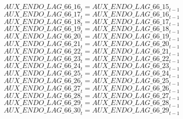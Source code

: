 \begin{dmath}
{AUX\_ENDO\_LAG\_66\_16}_{t}={AUX\_ENDO\_LAG\_66\_15}_{t-1}
\end{dmath}
\begin{dmath}
{AUX\_ENDO\_LAG\_66\_17}_{t}={AUX\_ENDO\_LAG\_66\_16}_{t-1}
\end{dmath}
\begin{dmath}
{AUX\_ENDO\_LAG\_66\_18}_{t}={AUX\_ENDO\_LAG\_66\_17}_{t-1}
\end{dmath}
\begin{dmath}
{AUX\_ENDO\_LAG\_66\_19}_{t}={AUX\_ENDO\_LAG\_66\_18}_{t-1}
\end{dmath}
\begin{dmath}
{AUX\_ENDO\_LAG\_66\_20}_{t}={AUX\_ENDO\_LAG\_66\_19}_{t-1}
\end{dmath}
\begin{dmath}
{AUX\_ENDO\_LAG\_66\_21}_{t}={AUX\_ENDO\_LAG\_66\_20}_{t-1}
\end{dmath}
\begin{dmath}
{AUX\_ENDO\_LAG\_66\_22}_{t}={AUX\_ENDO\_LAG\_66\_21}_{t-1}
\end{dmath}
\begin{dmath}
{AUX\_ENDO\_LAG\_66\_23}_{t}={AUX\_ENDO\_LAG\_66\_22}_{t-1}
\end{dmath}
\begin{dmath}
{AUX\_ENDO\_LAG\_66\_24}_{t}={AUX\_ENDO\_LAG\_66\_23}_{t-1}
\end{dmath}
\begin{dmath}
{AUX\_ENDO\_LAG\_66\_25}_{t}={AUX\_ENDO\_LAG\_66\_24}_{t-1}
\end{dmath}
\begin{dmath}
{AUX\_ENDO\_LAG\_66\_26}_{t}={AUX\_ENDO\_LAG\_66\_25}_{t-1}
\end{dmath}
\begin{dmath}
{AUX\_ENDO\_LAG\_66\_27}_{t}={AUX\_ENDO\_LAG\_66\_26}_{t-1}
\end{dmath}
\begin{dmath}
{AUX\_ENDO\_LAG\_66\_28}_{t}={AUX\_ENDO\_LAG\_66\_27}_{t-1}
\end{dmath}
\begin{dmath}
{AUX\_ENDO\_LAG\_66\_29}_{t}={AUX\_ENDO\_LAG\_66\_28}_{t-1}
\end{dmath}
\begin{dmath}
{AUX\_ENDO\_LAG\_66\_30}_{t}={AUX\_ENDO\_LAG\_66\_29}_{t-1}
\end{dmath}
